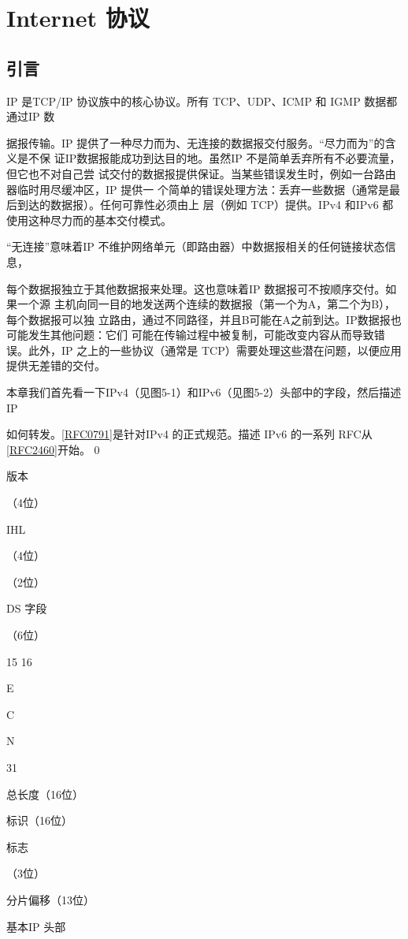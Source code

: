\chapter{Internet 协议}
\minitoc
\section{引言}
IP 是TCP/IP 协议族中的核心协议。所有 TCP、UDP、ICMP 和 IGMP 数据都通过IP 数

据报传输。IP 提供了一种尽力而为、无连接的数据报交付服务。“尽力而为”的含义是不保
证IP数据报能成功到达目的地。虽然IP 不是简单丢弃所有不必要流量，但它也不对自己尝
试交付的数据报提供保证。当某些错误发生时，例如一台路由器临时用尽缓冲区，IP 提供一
个简单的错误处理方法：丢弃一些数据（通常是最后到达的数据报）。任何可靠性必须由上
层（例如 TCP）提供。IPv4 和IPv6 都使用这种尽力而的基本交付模式。

“无连接”意味着IP 不维护网络单元（即路由器）中数据报相关的任何链接状态信息，

每个数据报独立于其他数据报来处理。这也意味着IP 数据报可不按顺序交付。如果一个源
主机向同一目的地发送两个连续的数据报（第一个为A，第二个为B），每个数据报可以独
立路由，通过不同路径，并且B可能在A之前到达。IP数据报也可能发生其他问题：它们
可能在传输过程中被复制，可能改变内容从而导致错误。此外，IP 之上的一些协议（通常是
TCP）需要处理这些潜在问题，以便应用提供无差错的交付。

本章我们首先看一下IPv4（见图5-1）和IPv6（见图5-2）头部中的字段，然后描述IP

如何转发。\href{https://www.rfc-editor.org/rfc/rfc0791}{[RFC0791]}是针对IPv4 的正式规范。描述 IPv6 的一系列 RFC从\href{https://www.rfc-editor.org/rfc/rfc2460}{[RFC2460]}开始。
0

版本

（4位）

IHL

（4位）

（2位）

DS 字段

（6位）

15 16

E

C

N

31

总长度（16位）

标识（16位）

标志

（3位）

分片偏移（13位）

基本IP 头部

